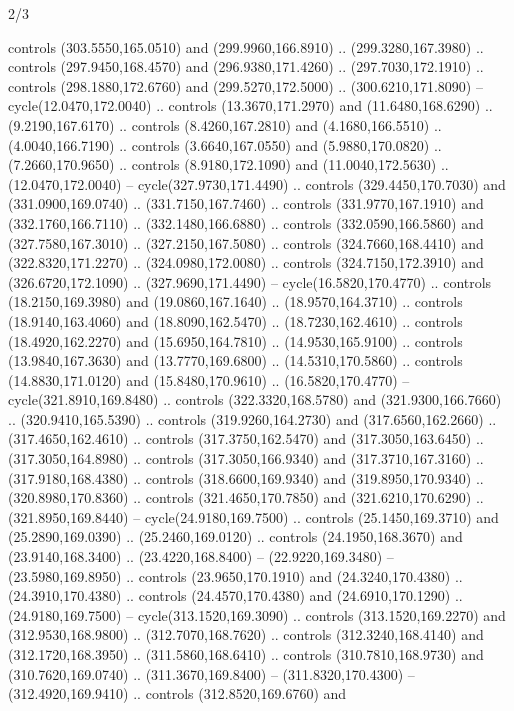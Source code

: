 \begin{flagdescription}{2/3}
\begin{scope}[xshift=0.5\flaglength,yshift=0.5\flagwidth,scale=\stretchfactor]
\begin{scope}[scale=0.001645\flagwidth,yshift=65mm,xshift=-63mm]
\begin{scope}[y=0.80pt, x=0.80pt, yscale=-1,]
\begin{scope}[cm={{1.33333,0.0,0.0,1.33333,(0.0,1e-05)}}]
  controls (303.5550,165.0510) and (299.9960,166.8910) .. (299.3280,167.3980) ..
  controls (297.9450,168.4570) and (296.9380,171.4260) .. (297.7030,172.1910) ..
  controls (298.1880,172.6760) and (299.5270,172.5000) .. (300.6210,171.8090) --
  cycle(12.0470,172.0040) .. controls (13.3670,171.2970) and (11.6480,168.6290)
  .. (9.2190,167.6170) .. controls (8.4260,167.2810) and (4.1680,166.5510) ..
  (4.0040,166.7190) .. controls (3.6640,167.0550) and (5.9880,170.0820) ..
  (7.2660,170.9650) .. controls (8.9180,172.1090) and (11.0040,172.5630) ..
  (12.0470,172.0040) -- cycle(327.9730,171.4490) .. controls (329.4450,170.7030)
  and (331.0900,169.0740) .. (331.7150,167.7460) .. controls (331.9770,167.1910)
  and (332.1760,166.7110) .. (332.1480,166.6880) .. controls (332.0590,166.5860)
  and (327.7580,167.3010) .. (327.2150,167.5080) .. controls (324.7660,168.4410)
  and (322.8320,171.2270) .. (324.0980,172.0080) .. controls (324.7150,172.3910)
  and (326.6720,172.1090) .. (327.9690,171.4490) -- cycle(16.5820,170.4770) ..
  controls (18.2150,169.3980) and (19.0860,167.1640) .. (18.9570,164.3710) ..
  controls (18.9140,163.4060) and (18.8090,162.5470) .. (18.7230,162.4610) ..
  controls (18.4920,162.2270) and (15.6950,164.7810) .. (14.9530,165.9100) ..
  controls (13.9840,167.3630) and (13.7770,169.6800) .. (14.5310,170.5860) ..
  controls (14.8830,171.0120) and (15.8480,170.9610) .. (16.5820,170.4770) --
  cycle(321.8910,169.8480) .. controls (322.3320,168.5780) and
  (321.9300,166.7660) .. (320.9410,165.5390) .. controls (319.9260,164.2730) and
  (317.6560,162.2660) .. (317.4650,162.4610) .. controls (317.3750,162.5470) and
  (317.3050,163.6450) .. (317.3050,164.8980) .. controls (317.3050,166.9340) and
  (317.3710,167.3160) .. (317.9180,168.4380) .. controls (318.6600,169.9340) and
  (319.8950,170.9340) .. (320.8980,170.8360) .. controls (321.4650,170.7850) and
  (321.6210,170.6290) .. (321.8950,169.8440) -- cycle(24.9180,169.7500) ..
  controls (25.1450,169.3710) and (25.2890,169.0390) .. (25.2460,169.0120) ..
  controls (24.1950,168.3670) and (23.9140,168.3400) .. (23.4220,168.8400) --
  (22.9220,169.3480) -- (23.5980,169.8950) .. controls (23.9650,170.1910) and
  (24.3240,170.4380) .. (24.3910,170.4380) .. controls (24.4570,170.4380) and
  (24.6910,170.1290) .. (24.9180,169.7500) -- cycle(313.1520,169.3090) ..
  controls (313.1520,169.2270) and (312.9530,168.9800) .. (312.7070,168.7620) ..
  controls (312.3240,168.4140) and (312.1720,168.3950) .. (311.5860,168.6410) ..
  controls (310.7810,168.9730) and (310.7620,169.0740) .. (311.3670,169.8400) --
  (311.8320,170.4300) -- (312.4920,169.9410) .. controls (312.8520,169.6760) and

\end{scope}
\end{scope}
\end{scope}
\end{scope}
\end{flagdescription}
